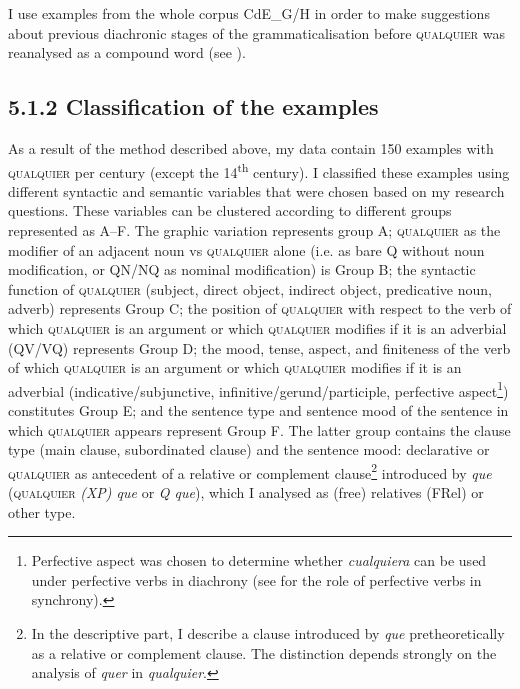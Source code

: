 I use examples from the whole corpus CdE\_G/H in order to make suggestions about previous diachronic stages of the grammaticalisation before \textsc{qualquier} was reanalysed as a compound word (see ). 

\subsection{\textbf{5.1.2} \textbf{Classification} \textbf{of} \textbf{the} \textbf{examples}}

As a result of the method described above, my data contain 150 examples with \textsc{qualquier} per century (except the 14\textsuperscript{th} century). I classified these examples using different syntactic and semantic variables that were chosen based on my research questions. These variables can be clustered according to different groups represented as A–F. The graphic variation represents group A; \textsc{qualquier} as the modifier of an adjacent noun vs \textsc{qualquier} alone (i.e. as bare Q without noun modification, or QN/NQ as nominal modification) is Group B; the syntactic function of \textsc{qualquier} (subject, direct object, indirect object, predicative noun, adverb) represents Group C; the position of \textsc{qualquier} with respect to the verb of which \textsc{qualquier} is an argument or which \textsc{qualquier} modifies if it is an adverbial (QV/VQ) represents Group D; the mood, tense, aspect, and finiteness of the verb of which \textsc{qualquier} is an argument or which \textsc{qualquier} modifies if it is an adverbial (indicative/subjunctive, infinitive/gerund/participle, perfective aspect\footnote{{Perfective aspect was chosen to determine whether} {\textit{cualquiera}} {can be used under perfective verbs in diachrony (see  for the role of perfective verbs in synchrony).}}) constitutes Group E; and the sentence type and sentence mood of the sentence in which \textsc{qualquier} appears represent Group F. The latter group contains the clause type (main clause, subordinated clause) and the sentence mood: declarative or \textsc{qualquier} as antecedent of a relative or complement clause\footnote{{In the descriptive part, I describe a clause introduced by} {\textit{que}} {pretheoretically as a relative or complement clause. The distinction depends strongly on the analysis of} {\textit{quer}} {in} {\textit{qualquier}}.} introduced by \textit{que} (\textsc{qualquier} \textit{(XP) que} or \textit{Q que}), which I analysed as (free) relatives (FRel) or other type.

